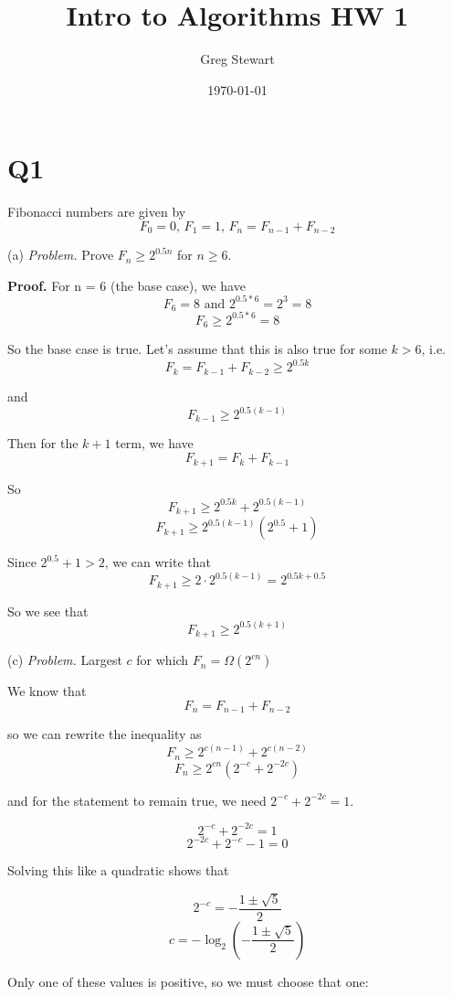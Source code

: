 \documentclass[12pt]{article}
\title{Intro to Algorithms HW 1}
\author{Greg Stewart}
\date{\today}
\begin{document}
\maketitle

\section*{Q1}

Fibonacci numbers are given by $$F_0 = 0 \text{, } F_1 = 1 \text{, } F_n = F_{n-1} + F_{n-2} $$

(a) \textit{Problem.} Prove $F_n \geq 2^{0.5n}$ for $n \geq 6$.

\smallskip

\textbf{Proof.} For n = 6 (the base case), we have $$F_6 = 8 \text{ and } 2^{0.5*6} = 2^3 = 8$$ $$F_6 \geq 2^{0.5*6} = 8$$

So the base case is true. Let's assume that this is also true for some $k > 6$, i.e. $$F_k = F_{k-1} + F_{k-2} \geq 2^{0.5k}$$ 

and 
$$F_{k-1} \geq 2^{0.5(k-1)}$$

Then for the $k+1$ term, we have $$F_{k+1} = F_k + F_{k-1}$$

So
$$F_{k+1} \geq 2^{0.5k} + 2^{0.5(k-1)}$$
$$F_{k+1} \geq  2^{0.5(k-1)} (2^{0.5} + 1)$$

Since $2^{0.5} + 1 > 2$, we can write that
$$F_{k+1} \geq 2 \cdot 2^{0.5(k-1)} = 2^{0.5k + 0.5}$$

So we see that
$$F_{k+1} \geq 2^{0.5(k+1)}$$

\smallskip

(c) \textit{Problem.} Largest $c$ for which $F_n = \Omega(2^{cn})$

\smallskip

We know that $$F_n = F_{n-1} + F_{n-2}$$

so we can rewrite the inequality as $$F_n \geq 2^{c(n-1)} + 2^{c(n-2)}$$ $$F_n \geq 2^{cn} (2^{-c} + 2^{-2c} )$$

and for the statement to remain true, we need $2^{-c} + 2^{-2c} = 1$.

$$2^{-c} + 2^{-2c} = 1$$
$$2^{-2c} + 2^{-c} - 1 = 0$$

Solving this like a quadratic shows that

$$2^{-c} = -\frac{1 \pm \sqrt{5}}{2}$$
$$c = -\log_2(-\frac{1 \pm \sqrt{5}}{2})$$

Only one of these values is positive, so we must choose that one:
\end{document}
